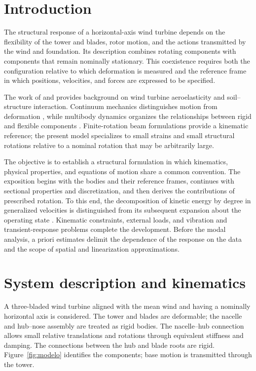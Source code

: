 \section{Introduction}
The structural response of a horizontal-axis wind turbine depends on the flexibility of the tower and blades, rotor motion, and the actions transmitted by the wind and foundation. Its description combines rotating components with components that remain nominally stationary. This coexistence requires both the configuration relative to which deformation is measured and the reference frame in which positions, velocities, and forces are expressed to be specified.

The work of \citet{maza2014} and \citet{turello2023} provides background on wind turbine aeroelasticity and soil--structure interaction. Continuum mechanics distinguishes motion from deformation \citep{holzapfel2000}, while multibody dynamics organizes the relationships between rigid and flexible components \citep{shabana2013}. Finite-rotation beam formulations \citep{simo1985} provide a kinematic reference; the present model specializes to small strains and small structural rotations relative to a nominal rotation that may be arbitrarily large.

The objective is to establish a structural formulation in which kinematics, physical properties, and equations of motion share a common convention. The exposition begins with the bodies and their reference frames, continues with sectional properties and discretization, and then derives the contributions of prescribed rotation. To this end, the decomposition of kinetic energy by degree in generalized velocities is distinguished from its subsequent expansion about the operating state \citep{meirovitch1997}. Kinematic constraints, external loads, and vibration and transient-response problems complete the development. Before the modal analysis, a priori estimates delimit the dependence of the response on the data and the scope of spatial and linearization approximations.

\section{System description and kinematics}
\label{sec:cinematica}
A three-bladed wind turbine aligned with the mean wind and having a nominally horizontal axis is considered. The tower and blades are deformable; the nacelle and hub--nose assembly are treated as rigid bodies. The nacelle--hub connection allows small relative translations and rotations through equivalent stiffness and damping. The connections between the hub and blade roots are rigid. Figure~\ref{fig:modelo} identifies the components; base motion is transmitted through the tower.

